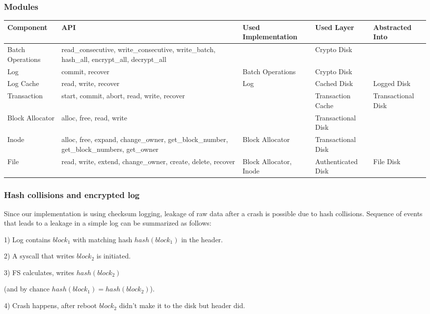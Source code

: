 \documentclass[onecolumn]{paper}
\begin{document}
		\subsubsection{Modules}
		\begin{tabularx}{\linewidth}{|L|L|L|L|L|}
		\hline
		Component & API & Used Implementation &	Used Layer & Abstracted Into \\
		\hline
		Batch Operations &
		read\_consecutive, write\_consecutive,
		write\_batch, hash\_all,
		encrypt\_all, decrypt\_all &
		& 
		Crypto Disk & 
		\\
		\hline
		Log &
		commit, recover &
		Batch Operations &
		Crypto Disk & 
		\\
		\hline
		Log Cache &
		read, 
		write, 
		recover &
		Log &
		Cached Disk &
		Logged Disk \\
		\hline
		Transaction &
		start, commit, abort, 
		read, write, recover &
		&
		Transaction Cache &
		Transactional Disk \\
		\hline
		Block Allocator &
		alloc, free, read, write &
		&
		Transactional Disk &
		\\
		\hline
		Inode &
		alloc, free, expand, change\_owner, get\_block\_number, get\_block\_numbers, get\_owner &
		Block Allocator &
		Transactional Disk &
		\\
		\hline
		File &
		read, write, extend, change\_owner, create, delete, recover &
		Block Allocator, Inode &
		Authenticated Disk &
		File Disk \\
		\hline
	\end{tabularx}

	\subsubsection{Hash collisions and encrypted log}
		Since our implementation is using checksum logging, leakage of raw data after a crash is possible due to hash collisions. Sequence of events that leads to a leakage in a simple log can be summarized as follows:
		
		1) Log contains $block_1$ with matching hash $hash(block_1)$ in the header.
		
		2) A syscall that writes $block_2$ is initiated.
		
		3) FS calculates, writes $hash(block_2)$ 
		
		  (and by chance $hash(block_1) = hash(block_2)$).
		  
		4) Crash happens, after reboot $block_2$ didn't make it to the disk but header did.
		
\end{document}
